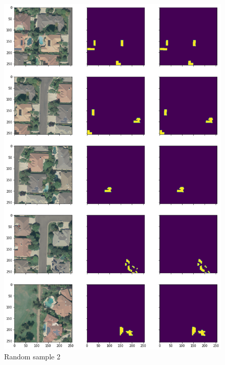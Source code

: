 \documentclass[a4paper, 12pt]{article}
\begin{document}
	\begin{figure}[H]
	    \centering
	    \includegraphics[height=0.92\textheight]{resources/png/representative_1.png}
	    \caption{Random sample 2}
	\end{figure}
	
\end{document}
